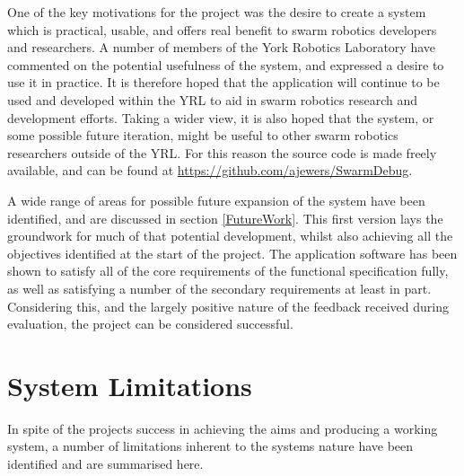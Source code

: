 One of the key motivations for the project was the desire to create a system which is practical, usable, and offers real benefit to swarm robotics developers and researchers. A number of members of the York Robotics Laboratory have commented on the potential usefulness of the system, and expressed a desire to use it in practice. It is therefore hoped that the application will continue to be used and developed within the YRL to aid in swarm robotics research and development efforts. Taking a wider view, it is also hoped that the system, or some possible future iteration, might be useful to other swarm robotics researchers outside of the YRL. For this reason the source code is made freely available, and can be found at \url{https://github.com/ajewers/SwarmDebug}.

A wide range of areas for possible future expansion of the system have been identified, and are discussed in section \ref{FutureWork}. This first version lays the groundwork for much of that potential development, whilst also achieving all the objectives identified at the start of the project. The application software has been shown to satisfy all of the core requirements of the functional specification fully, as well as satisfying a number of the secondary requirements at least in part. Considering this, and the largely positive nature of the feedback received during evaluation, the project can be considered successful.


\section{System Limitations}

In spite of the projects success in achieving the aims and producing a working system, a number of limitations inherent to the systems nature have been identified and are summarised here.


